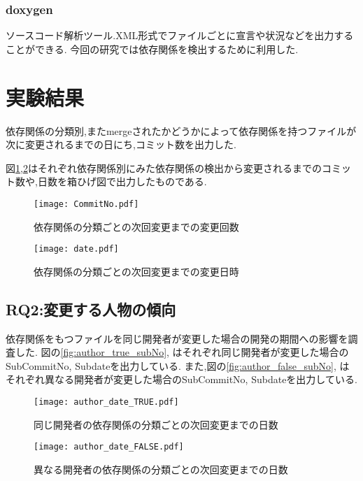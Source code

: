 \documentclass[submit,ses,noauthor]{ipsj} %
\begin{document}
\subsubsection{doxygen}
ソースコード解析ツール.XML形式でファイルごとに宣言や状況などを出力することができる.
今回の研究では依存関係を検出するために利用した.



\section{実験結果}\label{実験結果}
依存関係の分類別,またmergeされたかどうかによって依存関係を持つファイルが次に変更されるまでの日にち,コミット数を出力した.


図\ref{fig:subNo},\ref{fig:subdate}はそれぞれ依存関係別にみた依存関係の検出から変更されるまでのコミット数や,日数を箱ひげ図で出力したものである.　　

\begin{figure}
\centering
\texttt{[image: CommitNo.pdf]}
\caption{依存関係の分類ごとの次回変更までの変更回数}
\label{fig:subNo} 
\end{figure}

\begin{figure}
\centering
\texttt{[image: date.pdf]}
\caption{依存関係の分類ごとの次回変更までの変更日時}
\label{fig:subdate} 
\end{figure}


\subsection{RQ2:変更する人物の傾向}
依存関係をもつファイルを同じ開発者が変更した場合の開発の期間への影響を調査した.
図の\ref{fig:author_true_subNo},\label{fig:author_true_subdate} はそれぞれ同じ開発者が変更した場合のSubCommitNo, Subdateを出力している.
また,図の\ref{fig:author_false_subNo},\label{fig:author_false_subdate} はそれぞれ異なる開発者が変更した場合のSubCommitNo, Subdateを出力している.

\begin{figure}
\centering
\texttt{[image: author\_date\_TRUE.pdf]}
\caption{同じ開発者の依存関係の分類ごとの次回変更までの日数}
\label{fig:author_true_subdate} 
\end{figure}

\begin{figure}
\centering
\texttt{[image: author\_date\_FALSE.pdf]}
\caption{異なる開発者の依存関係の分類ごとの次回変更までの日数}
\label{fig:author_false_subdate} 
\end{figure}
\end{document}
